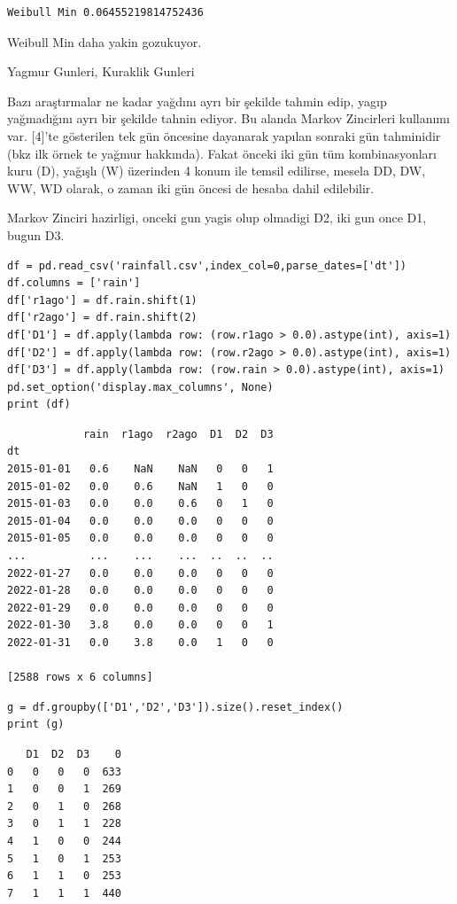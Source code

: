 \documentclass[12pt,fleqn]{article}\usepackage{../../common}
\begin{document}
\begin{verbatim}
Weibull Min 0.06455219814752436
\end{verbatim}

Weibull Min daha yakin gozukuyor.

Yagmur Gunleri, Kuraklik Gunleri

Bazı araştırmalar ne kadar yağdını ayrı bir şekilde tahmin edip, yagıp
yağmadığını ayrı bir şekilde tahnin ediyor. Bu alanda Markov Zincirleri
kullanımı var. [4]'te gösterilen tek gün öncesine dayanarak yapılan
sonraki gün tahminidir (bkz ilk örnek te yağmur hakkında). Fakat önceki
iki gün tüm kombinasyonları kuru (D), yağışlı (W) üzerinden 4 konum ile
temsil edilirse, mesela DD, DW, WW, WD olarak, o zaman iki gün öncesi de
hesaba dahil edilebilir.

Markov Zinciri hazirligi, onceki gun yagis olup olmadigi D2, iki gun once D1,
bugun D3.

\begin{verbatim}
df = pd.read_csv('rainfall.csv',index_col=0,parse_dates=['dt'])
df.columns = ['rain']
df['r1ago'] = df.rain.shift(1)
df['r2ago'] = df.rain.shift(2)
df['D1'] = df.apply(lambda row: (row.r1ago > 0.0).astype(int), axis=1)
df['D2'] = df.apply(lambda row: (row.r2ago > 0.0).astype(int), axis=1)
df['D3'] = df.apply(lambda row: (row.rain > 0.0).astype(int), axis=1)
pd.set_option('display.max_columns', None)
print (df)
\end{verbatim}

\begin{verbatim}
            rain  r1ago  r2ago  D1  D2  D3
dt                                        
2015-01-01   0.6    NaN    NaN   0   0   1
2015-01-02   0.0    0.6    NaN   1   0   0
2015-01-03   0.0    0.0    0.6   0   1   0
2015-01-04   0.0    0.0    0.0   0   0   0
2015-01-05   0.0    0.0    0.0   0   0   0
...          ...    ...    ...  ..  ..  ..
2022-01-27   0.0    0.0    0.0   0   0   0
2022-01-28   0.0    0.0    0.0   0   0   0
2022-01-29   0.0    0.0    0.0   0   0   0
2022-01-30   3.8    0.0    0.0   0   0   1
2022-01-31   0.0    3.8    0.0   1   0   0

[2588 rows x 6 columns]
\end{verbatim}

\begin{verbatim}
g = df.groupby(['D1','D2','D3']).size().reset_index()
print (g)
\end{verbatim}

\begin{verbatim}
   D1  D2  D3    0
0   0   0   0  633
1   0   0   1  269
2   0   1   0  268
3   0   1   1  228
4   1   0   0  244
5   1   0   1  253
6   1   1   0  253
7   1   1   1  440
\end{verbatim}
\end{document}
